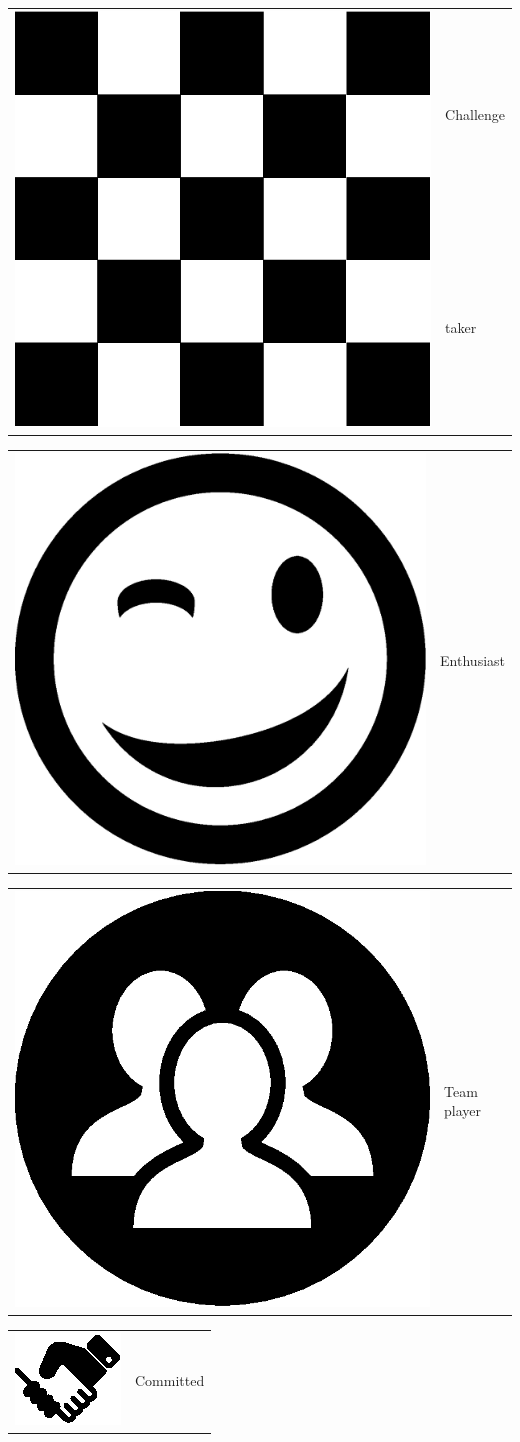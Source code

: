 \documentclass[letterpaper]{article}
\begin{document}
\begin{minipage}{1\linewidth}
\begin{minipage}{0.5\linewidth}
\begin{minipage}{1\linewidth}
		\begin{minipage}{0.49\linewidth}
			\begin{tabularx}{1\textwidth}{rX}
				\multirow{2}{*}{\includegraphics[width=0.12\linewidth]{chess.eps}}
				 & Challenge \\
				& taker
			\end{tabularx}
		\end{minipage}
		\begin{minipage}{0.49\linewidth}
		\centering
			\begin{tabularx}{1\textwidth}{rX}		
				 \includegraphics[width=0.12\linewidth]{wink.eps} & Enthusiast
			\end{tabularx}
		\end{minipage}	
		\begin{minipage}{0.49\linewidth}
		\centering
			\begin{tabularx}{1\textwidth}{rX}		
				 \includegraphics[width=0.12\linewidth]{group.eps} & Team player
			\end{tabularx}
		\end{minipage}				
		\begin{minipage}{0.49\linewidth}
		 	\centering
			\begin{tabularx}{1\textwidth}{rX}
				\includegraphics[width=0.12\linewidth]{handshake.eps} & 
				Committed
			\end{tabularx}
		\end{minipage}\\
		\vspace{2ex}
	\end{minipage}
	\begin{minipage}{1\linewidth}
\end{minipage}
\end{minipage}
\end{minipage}
\end{document}
